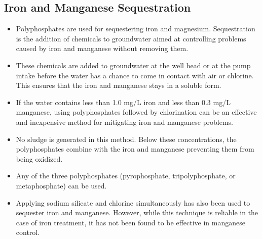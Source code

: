 \subsection{Iron and Manganese Sequestration}
\begin{itemize}
\item Polyphosphates are used for sequestering iron and magnesium. Sequestration is the addition of chemicals to groundwater aimed at controlling problems caused by iron and manganese without removing them.
\item These chemicals are added to groundwater at the well head or at the pump intake before the water has a chance to come in contact with air or chlorine. This ensures that the iron and manganese stays in a soluble form.
\item If the water contains less than 1.0 mg/L iron and less than 0.3 mg/L manganese, using polyphosphates followed by chlorination can be an effective and inexpensive method for mitigating iron and manganese problems. 
\item No sludge is generated in this method. Below these concentrations, the polyphosphates combine with the iron and manganese preventing them from being oxidized. 
\item Any of the three polyphosphates (pyrophosphate, tripolyphosphate, or metaphosphate) can be used.
\item Applying sodium silicate and chlorine simultaneously has also been used to sequester iron and manganese. However, while this technique is reliable in the case of iron treatment, it has not been found to be effective in manganese control.  
\end{itemize}


